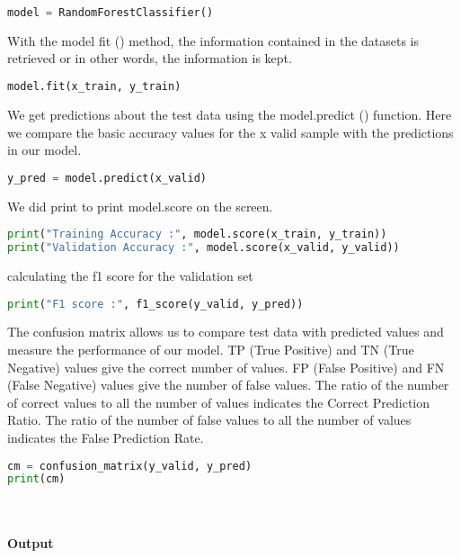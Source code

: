 \documentclass[onecolumn]{article}
\begin{document}
\begin{lstlisting}[language=Python, caption= model]
model = RandomForestClassifier()
\end{lstlisting}

With the model fit () method, the information contained in the datasets is retrieved or in other words, the information is kept.

\begin{lstlisting}[language=Python, caption= model.fit]
model.fit(x_train, y_train)
\end{lstlisting}

We get predictions about the test data using the model.predict () function. Here we compare the basic accuracy values for the x valid sample with the predictions in our model.

\begin{lstlisting}[language=Python, caption= prediction]
y_pred = model.predict(x_valid)
\end{lstlisting}

We did print to print model.score on the screen.

\begin{lstlisting}[language=Python, caption= prediction]
print("Training Accuracy :", model.score(x_train, y_train))
print("Validation Accuracy :", model.score(x_valid, y_valid))

\end{lstlisting}

calculating the f1 score for the validation set

\begin{lstlisting}[language=Python, caption= prediction]
print("F1 score :", f1_score(y_valid, y_pred))
\end{lstlisting}

The confusion matrix allows us to compare test data with predicted values and measure the performance of our model.
TP (True Positive) and TN (True Negative) values give the correct number of values.
FP (False Positive) and FN (False Negative) values give the number of false values.
The ratio of the number of correct values to all the number of values indicates the Correct Prediction Ratio.
The ratio of the number of false values to all the number of values indicates the False Prediction Rate.

\begin{lstlisting}[language=Python, caption= cm]
cm = confusion_matrix(y_valid, y_pred)
print(cm)

\end{lstlisting}
\\\\
\textbf{Output}
\end{document}
